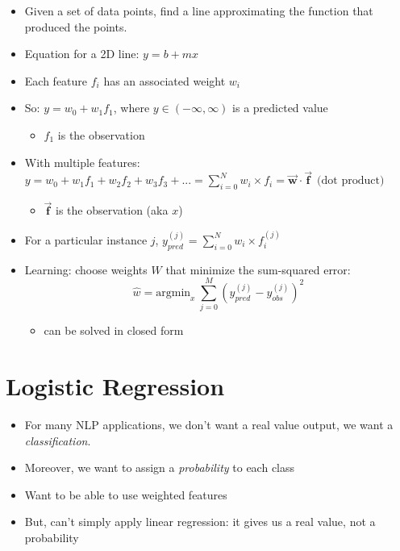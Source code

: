 \documentclass[11pt,letterpaper]{article}
\newcommand{\vv}[1]{\ensuremath{\vec{\mathbf{#1}}}}
\begin{document}
\begin{itemize}
  \item Given a set of data points, find a line approximating the function that produced the points.
  \item Equation for a 2D line: $y = b + mx$
  \item Each feature $f_i$ has an associated weight $w_i$
  \item So: $y = w_0 + w_1 f_1$, where $y \in (-\infty,\infty)$ is a predicted value
    \begin{itemize}
      \item $f_1$ is the observation
     \end{itemize}
  \item With multiple features: $y = w_0 + w_1 f_1 + w_2 f_2 + w_3 f_3 + ... = \sum_{i=0}^N w_i \times f_i  = \vv{w} \cdot \vv{f} ~~ \text{(dot product)}$
    \begin{itemize}
      \item $\vv{f}$ is the observation (aka $x$)
     \end{itemize}
  \item For a particular instance $j$, $y_{\textit{pred}}^{(j)} = \sum_{i=0}^N w_i \times f_i^{(j)}$
  \item Learning: choose weights $W$ that minimize the sum-squared error:
    \[\hat{w} = \text{argmin}_x~\sum_{j=0}^M (y_{\textit{pred}}^{(j)}-y_{\textit{obs}}^{(j)})^2\]
     \begin{itemize}
       \item can be solved in closed form
     \end{itemize}
\end{itemize}


\section{Logistic Regression}

\begin{itemize}
  \item For many NLP applications, we don't want a real value output, we want a \textit{classification}.
  \item Moreover, we want to assign a \textit{probability} to each class
  \item Want to be able to use weighted features
  \item But, can't simply apply linear regression: it gives us a real value, not a probability
\end{itemize}
\end{document}
